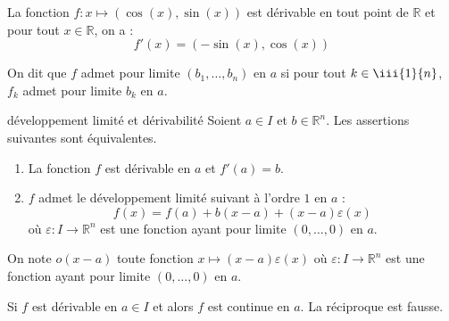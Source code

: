 \documentclass[french,11pt,twoside]{VcCours}
\begin{document}

\begin{Exemple} La fonction $f : x \mapsto (\cos(x), \sin(x))$ est dérivable en tout point de $\mathbb{R}$ et pour tout $x \in \mathbb{R}$, on a :
$$ f'(x) = (- \sin(x), \cos(x))$$
\end{Exemple}

\begin{Remarque}{} 
	On dit que $f$ admet pour limite $(b_1, \ldots, b_n)$ en $a$ si pour tout 
	$k \in \iii{1}{n}$, $f_k$ admet pour limite $b_k$ en $a$.
\end{Remarque}

\begin{Proposition}{développement limité et dérivabilité} Soient $a \in I$ et $b \in \mathbb{R}^n$. Les assertions suivantes sont équivalentes.

\begin{enumerate}
\item La fonction $f$ est dérivable en $a$ et $f'(a)=b$.
\item $f$ admet le développement limité suivant à l'ordre $1$ en $a$ :
$$ f(x) = f(a)+ b(x-a) + (x-a) \varepsilon(x)$$
où $\varepsilon : I \rightarrow \mathbb{R}^n$ est une fonction ayant pour limite $(0, \ldots, 0)$ en $a$.
\end{enumerate}
\end{Proposition}

\begin{Remarque}{} On note $o(x-a)$ toute fonction $x \mapsto (x-a)\varepsilon(x)$ où $\varepsilon : I \rightarrow \mathbb{R}^n$ est une fonction ayant pour limite $(0, \ldots, 0)$ en $a$.
\end{Remarque}

\begin{Corollaire}{} Si $f$ est dérivable en $a \in I$ et alors $f$ est continue en $a$. La réciproque est fausse.
\end{Corollaire}

\end{document}
